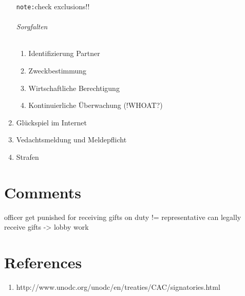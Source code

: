 \documentclass{article}
\begin{document}
\begin{enumerate}
			\texttt{note:}check exclusions!!
		
		\paragraph{Sorgfalten}
		\begin{enumerate}
			\item Identifizierung Partner
			\item Zweckbestimmung
			\item Wirtschaftliche Berechtigung
			\item Kontinuierliche Überwachung (!WHOAT?)
		\end{enumerate}
		
	\item Glückspiel im Internet
	\item Vedachtsmeldung und Meldepflicht
	\item Strafen
\end{enumerate}


\part[Comments]{Comments}
officer get punished for receiving gifts on duty != representative can legally receive gifts -> lobby work

\part[Links]{References}
\begin{enumerate}
	\item http://www.unodc.org/unodc/en/treaties/CAC/signatories.html
\end{enumerate}
\end{document}
